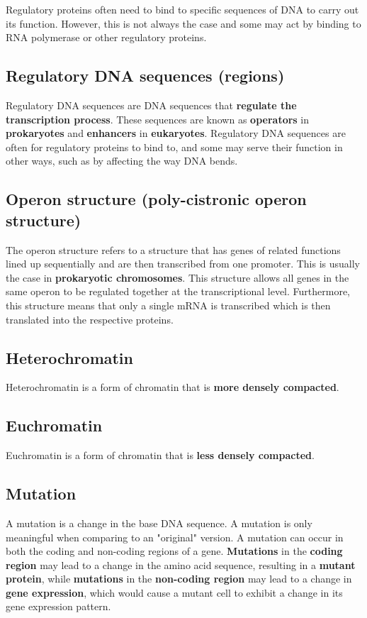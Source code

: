 \documentclass[11pt]{article}
\begin{document}
Regulatory proteins often need to bind to specific sequences of DNA to carry out its function. However, this is not always the case and some may act by binding to RNA polymerase or other regulatory proteins.
\subsection{Regulatory DNA sequences (regions)}
\label{sec:orgdcdb563}
Regulatory DNA sequences are DNA sequences that \textbf{regulate the transcription process}. These sequences are known as \textbf{operators} in \textbf{prokaryotes} and \textbf{enhancers} in \textbf{eukaryotes}. Regulatory DNA sequences are often for regulatory proteins to bind to, and some may serve their function in other ways, such as by affecting the way DNA bends.
\subsection{Operon structure (poly-cistronic operon structure)}
\label{sec:org9a4ad6b}
The operon structure refers to a structure that has genes of related functions lined up sequentially and are then transcribed from one promoter. This is usually the case in \textbf{prokaryotic chromosomes}. This structure allows all genes in the same operon to be regulated together at the transcriptional level. Furthermore, this structure means that only a single mRNA is transcribed which is then translated into the respective proteins.
\subsection{Heterochromatin}
\label{sec:org4fc6dc2}
Heterochromatin is a form of chromatin that is \textbf{more densely compacted}.
\subsection{Euchromatin}
\label{sec:orgc23fbef}
Euchromatin is a form of chromatin that is \textbf{less densely compacted}.

\newpage
\subsection{Mutation}
\label{sec:org3d87b08}
A mutation is a change in the base DNA sequence. A mutation is only meaningful when comparing to an "original" version. A mutation can occur in both the coding and non-coding regions of a gene. \textbf{Mutations} in the \textbf{coding region} may lead to a change in the amino acid sequence, resulting in a \textbf{mutant protein}, while \textbf{mutations} in the \textbf{non-coding region} may lead to a change in \textbf{gene expression}, which would cause a mutant cell to exhibit a change in its gene expression pattern.
\end{document}
